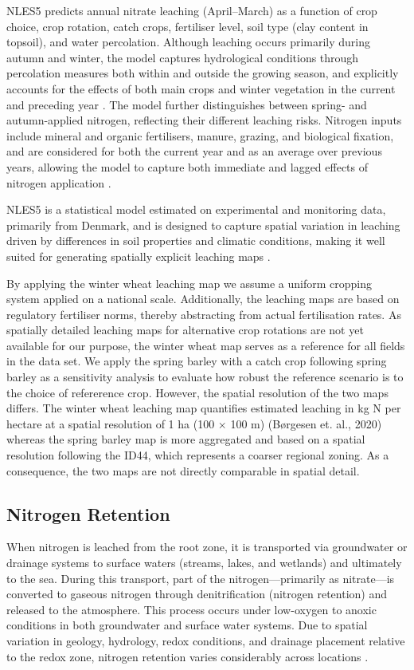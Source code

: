 \documentclass[12pt]{article}
\begin{document}
NLES5 predicts annual nitrate leaching (April--March) as a function of crop choice, crop rotation, catch crops, fertiliser level, soil type (clay content in topsoil), and water percolation. Although leaching occurs primarily during autumn and winter, the model captures hydrological conditions through percolation measures both within and outside the growing season, and explicitly accounts for the effects of both main crops and winter vegetation in the current and preceding year \citep{Borgesen2020}. The model further distinguishes between spring- and autumn-applied nitrogen, reflecting their different leaching risks. Nitrogen inputs include mineral and organic fertilisers, manure, grazing, and biological fixation, and are considered for both the current year and as an average over previous years, allowing the model to capture both immediate and lagged effects of nitrogen application \citep{Borgesen2020}.

NLES5 is a statistical model estimated on experimental and monitoring data, primarily from Denmark, and is designed to capture spatial variation in leaching driven by differences in soil properties and climatic conditions, making it well suited for generating spatially explicit leaching maps \citep{Borgesen2020}. 

By applying the winter wheat leaching map we assume a uniform cropping system applied on a national scale. Additionally, the leaching maps are based on regulatory fertiliser norms, thereby abstracting from actual fertilisation rates. As spatially detailed leaching maps for alternative crop rotations are not yet available for our purpose, the winter wheat map serves as a reference for all fields in the data set. We apply the spring barley with a catch crop following spring barley as a sensitivity analysis to evaluate how robust the reference scenario is to the choice of refererence crop. However, the spatial resolution of the two maps differs. The winter wheat leaching map quantifies estimated leaching in kg N per hectare at a spatial resolution of 1 ha (100 $\times$ 100 m) (Børgesen et. al., 2020) whereas the spring barley map is more aggregated and based on a spatial resolution following the ID44, which represents a coarser regional zoning. As a consequence, the two maps are not directly comparable in spatial detail.


\subsection{Nitrogen Retention}
When nitrogen is leached from the root zone, it is transported via groundwater or drainage systems to surface waters (streams, lakes, and wetlands) and ultimately to the sea. During this transport, part of the nitrogen---primarily as nitrate---is converted to gaseous nitrogen through denitrification (nitrogen retention) and released to the atmosphere. This process occurs under low-oxygen to anoxic conditions in both groundwater and surface water systems. Due to spatial variation in geology, hydrology, redox conditions, and drainage placement relative to the redox zone, nitrogen retention varies considerably across locations 
\citep{Hojberg2025}.
\end{document}
